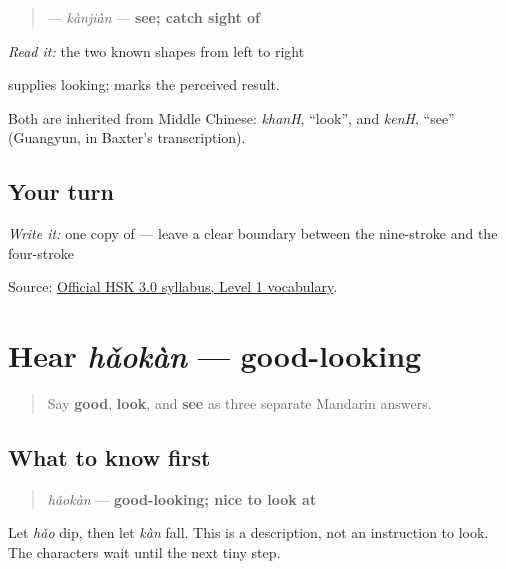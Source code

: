 \begin{cousinweb}
\begin{quote}
\textbf{} — \emph{kànjiàn} — \textbf{see; catch sight of}
\end{quote}

\emph{Read it:} the two known shapes from left to right

 supplies looking;  marks the perceived result.

Both are inherited from Middle Chinese: \emph{khanH}, \textquotedblleft{}look\textquotedblright{}, and \emph{kenH}, \textquotedblleft{}see\textquotedblright{} (Guangyun, in Baxter's transcription).
\end{cousinweb}

\subsection*{Your turn}
\emph{Write it:} one copy of \textbf{} — leave a clear boundary between the nine-stroke  and the four-stroke 

\begin{tcolorbox}[breakable,colback=teal!4,colframe=teal!35!black,title={Before you move on}]
Source: \href{https://hsk.cn-bj.ufileos.com/3.0/\%E6\%96\%B0\%E7\%89\%88HSK\%E8\%80\%83\%E8\%AF\%95\%E5\%A4\%A7\%E7\%BA\%B21219.pdf}{Official HSK 3.0 syllabus, Level 1 vocabulary}.
\end{tcolorbox}
\section[hǎokàn]{Hear \emph{hǎokàn} — good-looking}

\label{lesson:ZH-C18-hear-haokan}



\begin{quote}
Say \textbf{good}, \textbf{look}, and \textbf{see} as three separate Mandarin answers.
\end{quote}

\subsection*{What to know first}
\begin{quote}
\emph{hǎokàn} — \textbf{good-looking; nice to look at}
\end{quote}

Let \emph{hǎo} dip, then let \emph{kàn} fall. This is a description, not an instruction to look. The characters wait until the next tiny step.

